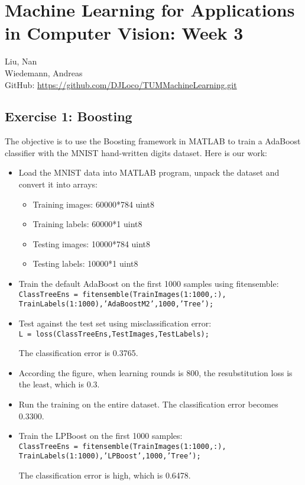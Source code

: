 \documentclass[12pt,a4paper,twoside]{article}
\begin{document}
\section*{Machine Learning for Applications \\
in Computer Vision: Week 3}
\hrulefill

Liu, Nan \\
Wiedemann, Andreas\\

GitHub: \url{https://github.com/DJLoco/TUMMachineLearning.git}\\


\hrulefill

\subsection*{Exercise 1: Boosting}
The objective is to use the Boosting framework in MATLAB to train a AdaBoost classifier with the MNIST hand-written digits dataset. Here is our work:

\begin{itemize}
\item Load the MNIST data into MATLAB program, unpack the dataset and convert it into arrays: 
  \begin{itemize}
  \item Training images: 60000*784 uint8
  \item Training labels:  60000*1 uint8
  \item Testing images: 10000*784 uint8
  \item Testing labels: 10000*1 uint8
  \end{itemize}
\item Train the default AdaBoost on the first 1000 samples using fitensemble: 
\texttt{ClassTreeEns = fitensemble(TrainImages(1:1000,:),\\
\hspace*{35mm} TrainLabels(1:1000),'AdaBoostM2',1000,'Tree');}
\item Test against the test set using misclassification error:\\
\texttt{L = loss(ClassTreeEns,TestImages,TestLabels);}

The classification error is 0.3765.
\item According the figure, when learning rounds is 800, the resubstitution loss is the least,  which is 0.3.
\item Run the training on the entire dataset. The classification error becomes 0.3300.
\item Train the LPBoost on the first 1000 samples:\\
\texttt{ClassTreeEns = fitensemble(TrainImages(1:1000,:),\\
 \hspace*{35mm} TrainLabels(1:1000),’LPBoost’,1000,’Tree’);}

The classification error is high, which is 0.6478. 
\end{itemize}
\end{document}
